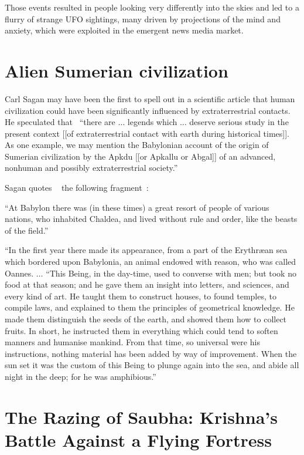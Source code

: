 Those events resulted in people looking very differently into the skies and led to a flurry of strange UFO sightings, many driven by projections of the mind and anxiety, which were exploited in the emergent news media market.

\section{Alien Sumerian civilization}
\label{2023-UFO-part-History-chapter-pre-1945-asc}

Carl Sagan may have been the first to spell out in a scientific article
that human civilization could have been significantly influenced by extraterrestrial contacts.
He speculated that~\cite[p.~496]{Sagan_1963} ``there are  $\ldots$ legends which  $\ldots$
deserve serious study in the present context [[of extraterrestrial contact with earth during
historical times]]. As one example, we may mention the
Babylonian account of the origin of Sumerian civilization by the Apkdu [[or Apkallu or Abgal]]
of an advanced, nonhuman and possibly extraterrestrial society.''

Sagan quotes ~\cite{Sagan_1963,Shklovskii1998Nov,Zygutis2016Nov}
the following fragment~\cite[pp.~56,57]{Cory1876Sep}:
\begin{svgraybox}
``At Babylon there was (in these times) a great resort of people of various nations, who inhabited Chaldea,
and lived without rule and order, like the beasts of the field.''

``In the first year there made its appearance, from
a part of the Erythr{\ae}an sea which bordered upon
Babylonia, an animal endowed with reason, who was
called Oannes.
$\ldots$
``This Being, in the day-time, used to converse with
men; but took no food at that season; and he gave
them an insight into letters, and sciences, and every
kind of art. He taught them to construct houses,
to found temples, to compile laws, and explained to
them the principles of geometrical knowledge. He
made them distinguish the seeds of the earth, and
showed them how to collect fruits. In short, he
instructed them in everything which could tend to
soften manners and humanise mankind. From that
time, so universal were his instructions, nothing
material has been added by way of improvement.
When the sun set it was the custom of this Being to
plunge again into the sea, and abide all night in the
deep; for he was amphibious.''
\end{svgraybox}

\section{The Razing of Saubha: Krishna's Battle Against a Flying Fortress}
\label{2023-UFO-part-History-chapter-pre-1945-Saubha}

